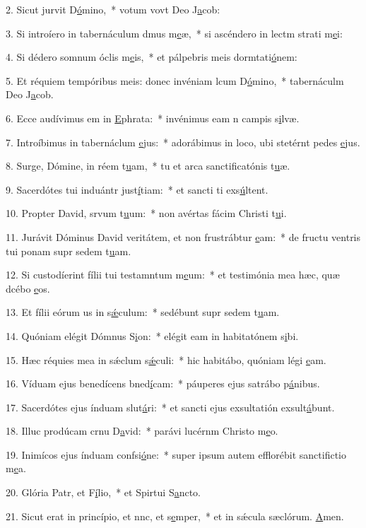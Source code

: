 2. Sicut jurvit D\uline{ó}mino,~* votum vovt Deo J\uline{a}cob:\par 
3. Si introíero in tabernáculum dmus m\uline{e}æ,~* si ascéndero in lectm strati m\uline{e}i:\par 
4. Si dédero somnum óclis m\uline{e}is,~* et pálpebris meis dormtati\uline{ó}nem:\par 
5. Et réquiem tempóribus meis: donec invéniam lcum D\uline{ó}mino,~* tabernáculm Deo J\uline{a}cob.\par 
6. Ecce audívimus em in \uline{E}phrata:~* invénimus eam n campis s\uline{i}lvæ.\par 
7. Introíbimus in tabernáclum \uline{e}jus:~* adorábimus in loco, ubi stetérnt pedes \uline{e}jus.\par 
8. Surge, Dómine, in réem t\uline{u}am,~* tu et arca sanctificatónis t\uline{u}æ.\par 
9. Sacerdótes tui induántr just\uline{í}tiam:~* et sancti ti exs\uline{ú}ltent.\par 
10. Propter David, srvum t\uline{u}um:~* non avértas fácim Christi t\uline{u}i.\par 
11. Jurávit Dóminus David veritátem, et non frustrábtur \uline{e}am:~* de fructu ventris tui ponam supr sedem t\uline{u}am.\par 
12. Si custodíerint fílii tui testamntum m\uline{e}um:~* et testimónia mea hæc, quæ dcébo \uline{e}os.\par 
13. Et fílii eórum us in s\uline{ǽ}culum:~* sedébunt supr sedem t\uline{u}am.\par 
14. Quóniam elégit Dómnus S\uline{i}on:~* elégit eam in habitatónem s\uline{i}bi.\par 
15. Hæc réquies mea in sǽclum s\uline{ǽ}culi:~* hic habitábo, quóniam légi \uline{e}am.\par 
16. Víduam ejus benedícens bned\uline{í}cam:~* páuperes ejus satrábo p\uline{á}nibus.\par 
17. Sacerdótes ejus índuam slut\uline{á}ri:~* et sancti ejus exsultatión exsult\uline{á}bunt.\par 
18. Illuc prodúcam crnu D\uline{a}vid:~* parávi lucérnm Christo m\uline{e}o.\par 
19. Inimícos ejus índuam confsi\uline{ó}ne:~* super ipsum autem efflorébit sanctifictio m\uline{e}a.\par 
20. Glória Patr, et F\uline{í}lio,~* et Spirtui S\uline{a}ncto.\par 
21. Sicut erat in princípio, et nnc, et s\uline{e}mper,~* et in sǽcula sæclórum. \uline{A}men.\par 
